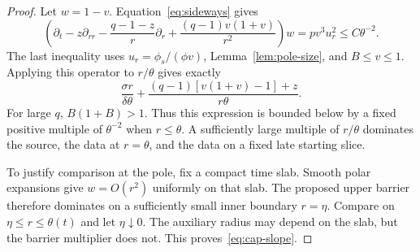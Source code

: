 \begin{proof}
Let \(w=1-v\). Equation~\eqref{eq:sideways} gives
\begin{equation}\label{eq:w-operator}
\left(\partial_t-z\partial_{rr}-\frac{q-1-z}{r}\partial_r
       +\frac{(q-1)v(1+v)}{r^2}\right)w
=pv^3u_r^2\le C\theta^{-2}.
\end{equation}
The last inequality uses \(u_r=\phi_s/(\phi v)\),
Lemma~\ref{lem:pole-size}, and \(B\le v\le1\).
Applying this operator to \(r/\theta\) gives exactly
\[
\frac{\sigma r}{\delta\theta}
+\frac{(q-1)[v(1+v)-1]+z}{r\theta}.
\]
For large \(q\), \(B(1+B)>1\). Thus this expression is bounded below
by a fixed positive multiple of \(\theta^{-2}\) when \(r\le\theta\).
A sufficiently large multiple of \(r/\theta\) dominates the source,
the data at \(r=\theta\), and the data on a fixed late starting slice.

To justify comparison at the pole, fix a compact time slab. Smooth polar
expansions give \(w=O(r^2)\) uniformly on that slab. The proposed upper
barrier therefore dominates on a sufficiently small inner boundary
\(r=\eta\). Compare on \(\eta\le r\le\theta(t)\) and let
\(\eta\downarrow0\). The auxiliary radius may depend on the slab, but
the barrier multiplier does not. This proves~\eqref{eq:cap-slope}.
\end{proof}

